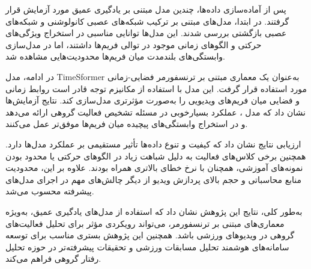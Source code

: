 \documentclass[12pt]{report}
\begin{document}
پس از آماده‌سازی داده‌ها، چندین مدل مبتنی بر یادگیری عمیق مورد آزمایش قرار گرفتند. در ابتدا، مدل‌های مبتنی بر ترکیب شبکه‌های عصبی کانولوشنی و شبکه‌های عصبی بازگشتی بررسی شدند. این مدل‌ها توانایی مناسبی در استخراج ویژگی‌های حرکتی و الگوهای زمانی موجود در توالی فریم‌ها داشتند، اما در مدل‌سازی وابستگی‌های بلندمدت میان فریم‌ها محدودیت‌هایی مشاهده شد.

در ادامه، مدل TimeSformer به‌عنوان یک معماری مبتنی بر ترنسفورمر فضایی-زمانی مورد استفاده قرار گرفت. این مدل با استفاده از مکانیزم توجه قادر است روابط زمانی و فضایی میان فریم‌های ویدیویی را به‌صورت مؤثرتری مدل‌سازی کند. نتایج آزمایش‌ها نشان داد که مدل‌ ، عملکرد بسیارخوبی در مسئله تشخیص فعالیت گروهی ارائه می‌دهد و در استخراج وابستگی‌های پیچیده میان فریم‌ها موفق‌تر عمل می‌کنند.

ارزیابی نتایج نشان داد که کیفیت و تنوع داده‌ها تأثیر مستقیمی بر عملکرد مدل‌ها دارد. همچنین برخی کلاس‌های فعالیت به دلیل شباهت زیاد در الگوهای حرکتی یا محدود بودن نمونه‌های آموزشی، همچنان با نرخ خطای بالاتری همراه بودند. علاوه بر این، محدودیت منابع محاسباتی و حجم بالای پردازش ویدیو از دیگر چالش‌های مهم در اجرای مدل‌های پیشرفته محسوب می‌شد.

به‌طور کلی، نتایج این پژوهش نشان داد که استفاده از مدل‌های یادگیری عمیق، به‌ویژه معماری‌های مبتنی بر ترنسفورمر، می‌تواند رویکردی مؤثر برای تحلیل فعالیت‌های گروهی در ویدیوهای ورزشی باشد. همچنین این پژوهش بستری مناسب برای توسعه سامانه‌های هوشمند تحلیل مسابقات ورزشی و تحقیقات پیشرفته‌تر در حوزه تحلیل رفتار گروهی فراهم می‌کند.
\end{document}
